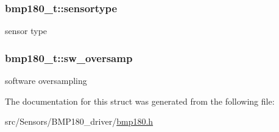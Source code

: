 \subsubsection[{\texorpdfstring{sensortype}{sensortype}}]{ bmp180\+\_\+t\+::sensortype}\hypertarget{structbmp180__t_a9b9ced8e0fdb8fb0ab04a875e4d46f38}{}\label{structbmp180__t_a9b9ced8e0fdb8fb0ab04a875e4d46f38}
sensor type 
\subsubsection[{\texorpdfstring{sw\+\_\+oversamp}{sw_oversamp}}]{ bmp180\+\_\+t\+::sw\+\_\+oversamp}\hypertarget{structbmp180__t_a0bda5ec8f08249ee69f2e4a14df59f6e}{}\label{structbmp180__t_a0bda5ec8f08249ee69f2e4a14df59f6e}
software oversampling 

The documentation for this struct was generated from the following file\+:\begin{DoxyCompactItemize}
\item 
src/\+Sensors/\+B\+M\+P180\+\_\+driver/\hyperlink{bmp180_8h}{bmp180.\+h}\end{DoxyCompactItemize}
